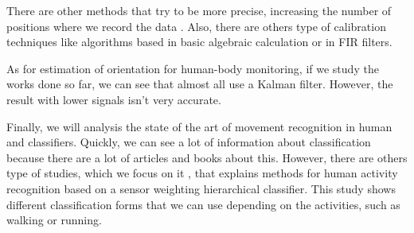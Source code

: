 There are other methods that try to be more precise, increasing the number of positions where we record the data \cite{Camps2009}. Also, there are others type of calibration techniques like algorithms based in basic algebraic calculation or in FIR filters. \cite{A.Olivares2013}

As for estimation of orientation for human-body monitoring, if we study the works done so far, we can see that almost all  use a Kalman filter. However, the result with lower signals isn’t very accurate.\cite{A.Olivares2013}

Finally, we will analysis the state of the art of movement recognition in human and classifiers. Quickly, we can see a lot of information about classification because there are a lot of articles and books about this. However, there are others type of studies, which we focus on  it \cite{Banos2012}, that explains methods for human activity recognition based on a sensor weighting hierarchical classifier. This study shows different classification forms that we can use depending on the activities, such as walking or running.

